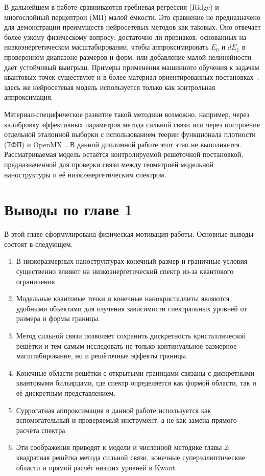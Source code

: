 В дальнейшем в работе сравниваются гребневая регрессия (Ridge) и многослойный перцептрон
(МП) малой ёмкости. Это сравнение не предназначено для демонстрации преимуществ
нейросетевых методов как таковых. Оно отвечает более узкому физическому вопросу:
достаточно ли признаков, основанных на низкоэнергетическом масштабировании, чтобы
аппроксимировать $E_0$ и $dE_1$ в проверенном диапазоне размеров и форм, или добавление
малой нелинейности даёт устойчивый выигрыш. Примеры применения машинного обучения к
задачам квантовых точек существуют и в более материал-ориентированных
постановках~\cite{zielinski2025nanowireml}; здесь же нейросетевая модель используется
только как контрольная аппроксимация.

Материал-специфическое развитие такой методики возможно, например, через калибровку
эффективных параметров метода сильной связи или через построение отдельной эталонной
выборки с использованием теории функционала плотности (ТФП) и OpenMX~\cite{hohenberg1964in
homogeneous,kohn1965selfconsistent,ozaki2003openmx}. В данной дипломной работе этот этап
не выполняется. Рассматриваемая модель остаётся контролируемой решёточной постановкой,
предназначенной для проверки связи между геометрией модельной наноструктуры и её
низкоэнергетическим спектром.

\section{Выводы по главе 1}

В этой главе сформулирована физическая мотивация работы. Основные выводы состоят в
следующем.

\begin{enumerate}
  \item В низкоразмерных наноструктурах конечный размер и граничные условия существенно
  влияют на низкоэнергетический спектр из-за квантового ограничения.
  \item Модельные квантовые точки и конечные нанокристаллиты являются удобными объектами
  для изучения зависимости спектральных уровней от размера и формы границы.
  \item Метод сильной связи позволяет сохранить дискретность кристаллической решётки и тем
  самым исследовать не только континуальное размерное масштабирование, но и решёточные
  эффекты границы.
  \item Конечные области решётки с открытыми границами связаны с дискретными квантовыми
  бильярдами, где спектр определяется как формой области, так и её дискретным
  представлением.
  \item Суррогатная аппроксимация в данной работе используется как вспомогательный и
  проверяемый инструмент, а не как замена прямого расчёта спектра.
  \item Эти соображения приводят к модели и численной методике главы 2: квадратная решётка
  метода сильной связи, конечные суперэллиптические области и прямой расчёт низших уровней
  в Kwant.
\end{enumerate}

\clearpage
